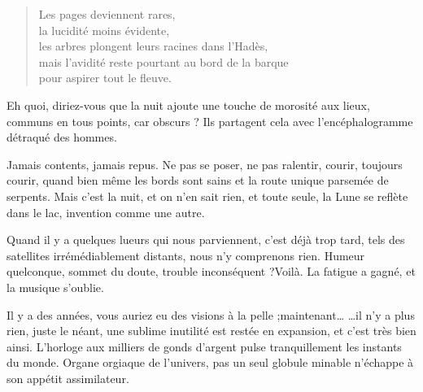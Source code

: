   \begin{verse}
    Les pages deviennent rares,\\
    la lucidité moins évidente,\\
    les arbres plongent leurs racines dans l'Hadès,\\
    mais l'avidité reste pourtant au bord de la barque\\
    pour aspirer tout le fleuve.
  \end{verse}
  Eh  quoi,  diriez-vous  que  la  nuit   ajoute  une  touche  de  morosité  aux
  lieux,  communs  en  tous  points,  car  obscurs  ?  Ils  partagent  cela  avec
  l'encéphalogramme détraqué des hommes.

  Jamais  contents, jamais  repus.  Ne pas  se poser,  ne  pas ralentir,  courir,
  toujours  courir, quand  bien même  les bords  sont sains  et la  route unique
  parsemée de  serpents. Mais  c'est la  nuit, et  on n'en  sait rien,  et toute
  seule, la Lune se reflète dans le lac, invention comme une autre.

  Quand il y a quelques lueurs qui nous parviennent, c'est déjà trop tard, tels
  des satellites  irrémédiablement distants,  nous n'y comprenons  rien. Humeur
  quelconque,  sommet  du doute,  trouble  inconséquent  ?Voilà. La  fatigue  a
  gagné, et la musique s'oublie.

  Il y a des années, vous auriez eu des visions à la pelle ;maintenant… …il
  n'y  a plus  rien,  juste le  néant,  une sublime  inutilité  est restée  en
  expansion, et c'est très bien ainsi.
  L'horloge aux milliers  de gonds d'argent pulse tranquillement  les instants du
  monde. Organe orgiaque de l'univers, pas  un seul globule minable n'échappe à
  son appétit assimilateur.

